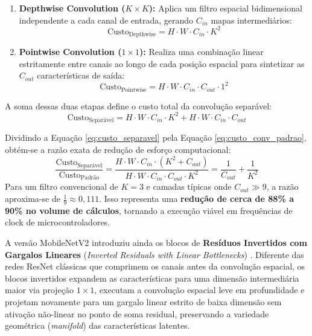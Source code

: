 \begin{enumerate}
    \item \textbf{Depthwise Convolution ($K \times K$):} Aplica um filtro espacial bidimensional independente a cada canal de entrada, gerando $C_{in}$ mapas intermediários:
    \begin{equation}
    \text{Custo}_{\text{Depthwise}} = H \cdot W \cdot C_{in} \cdot K^2
    \end{equation}
    \item \textbf{Pointwise Convolution ($1 \times 1$):} Realiza uma combinação linear estritamente entre canais ao longo de cada posição espacial para sintetizar as $C_{out}$ características de saída:
    \begin{equation}
    \text{Custo}_{\text{Pointwise}} = H \cdot W \cdot C_{in} \cdot C_{out} \cdot 1^2
    \end{equation}
\end{enumerate}

A soma dessas duas etapas define o custo total da convolução separável:
\begin{equation}
\text{Custo}_{\text{Separável}} = H \cdot W \cdot C_{in} \cdot K^2 + H \cdot W \cdot C_{in} \cdot C_{out}
\label{eq:custo_separavel}
\end{equation}

Dividindo a Equação \ref{eq:custo_separavel} pela Equação \ref{eq:custo_conv_padrao}, obtém-se a razão exata de redução de esforço computacional:
\begin{equation}
\frac{\text{Custo}_{\text{Separável}}}{\text{Custo}_{\text{Padrão}}} = \frac{H \cdot W \cdot C_{in} \cdot (K^2 + C_{out})}{H \cdot W \cdot C_{in} \cdot C_{out} \cdot K^2} = \frac{1}{C_{out}} + \frac{1}{K^2}
\label{eq:razao_mobilenet}
\end{equation}
Para um filtro convencional de $K = 3$ e camadas típicas onde $C_{out} \gg 9$, a razão aproxima-se de $\frac{1}{9} \approx 0,111$. Isso representa uma \textbf{redução de cerca de 88\% a 90\% no volume de cálculos}, tornando a execução viável em frequências de clock de microcontroladores.

A versão MobileNetV2 introduziu ainda os blocos de \textbf{Resíduos Invertidos com Gargalos Lineares} (\textit{Inverted Residuals with Linear Bottlenecks}) \cite{sandler2018mobilenetv2}. Diferente das redes ResNet clássicas que comprimem os canais antes da convolução espacial, os blocos invertidos expandem as características para uma dimensão intermediária maior via projeção $1\times1$, executam a convolução espacial leve em profundidade e projetam novamente para um gargalo linear estrito de baixa dimensão sem ativação não-linear no ponto de soma residual, preservando a variedade geométrica (\textit{manifold}) das características latentes.


